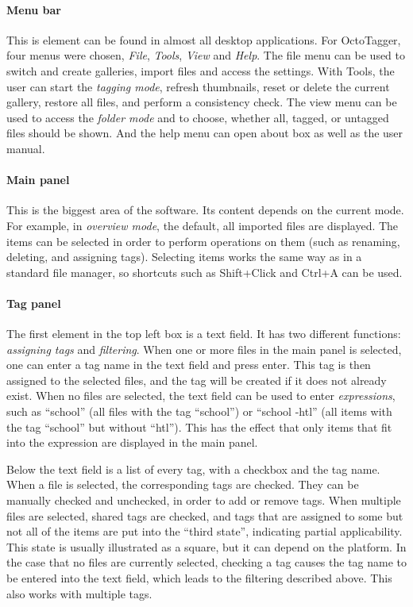 \paragraph{Menu bar} This is element can be found in almost all desktop
applications. For OctoTagger, four menus were chosen, \emph{File},
\emph{Tools}, \emph{View} and \emph{Help}. The file menu can be used to switch
and create galleries, import files and access the settings. With Tools, the
user can start the \emph{tagging mode}, refresh thumbnails, reset or delete the
current gallery, restore all files, and perform a consistency check.  The view
menu can be used to access the \emph{folder mode} and to choose, whether all,
tagged, or untagged files should be shown. And the help menu can open about box
as well as the user manual.

\paragraph{Main panel} This is the biggest area of the software. Its content
depends on the current mode. For example, in \emph{overview mode}, the default,
all imported files are displayed. The items can be selected in order to perform
operations on them (such as renaming, deleting, and assigning tags). Selecting
items works the same way as in a standard file manager, so shortcuts
such as Shift+Click and Ctrl+A can be used. %

\paragraph{Tag panel} The first element in the top left box is a text field. It
has two different functions: \emph{assigning tags} and \emph{filtering}.  When
one or more files in the main panel is selected, one can enter a tag name in
the text field and press enter. This tag is then assigned to the selected
files, and the tag will be created if it does not already exist. When no files
are selected, the text field can be used to enter \emph{expressions}, such as
``school'' (all files with the tag ``school'') or ``school -htl'' (all items
with the tag ``school'' but without ``htl''). This has the effect that only
items that fit into the expression are displayed in the main panel.

Below the text field is a list of every tag, with a checkbox and the tag name.
When a file is selected, the corresponding tags are checked. They can be
manually checked and unchecked, in order to add or remove tags. When multiple
files are selected, shared tags are checked, and tags that are assigned to some
but not all of the items are put into the ``third state'', indicating partial
applicability. This state is usually illustrated as a square, but it can depend
on the platform. In the case that no files are currently selected, checking a
tag causes the tag name to be entered into the text field, which leads to the
filtering described above. This also works with multiple tags.

